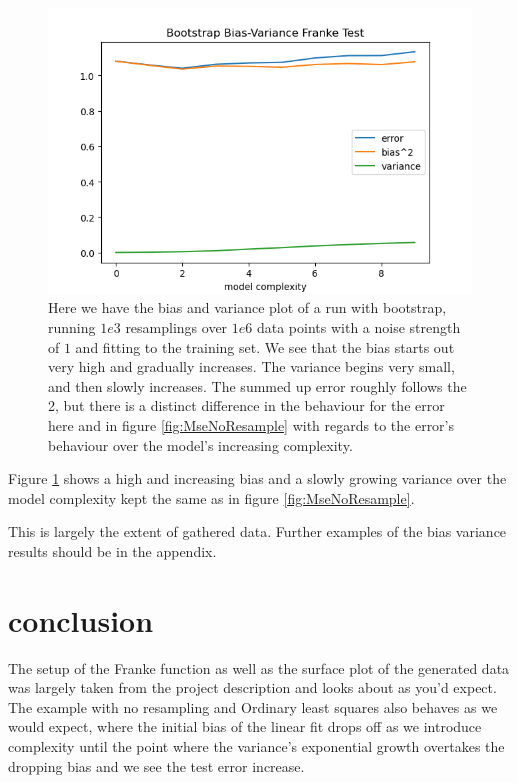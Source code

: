 \documentclass[12pt]{revtex4-2}
\begin{document}
\begin{figure}[hbtp]
\includegraphics[scale=0.7]{
	../plots/frankeBootstrapBiasVariancesigma1poly10boot1e3datapt1e6test.png}
\caption{
	Here we have the bias and variance plot of a run with bootstrap, running $1e3$ 
	resamplings over $1e6$ data points with a noise strength of $1$ and fitting to the training
	set. We see that the bias starts out very high and gradually increases. The variance begins 
	very small, and then slowly increases. The summed up error roughly follows the 2, but there 
	is a distinct difference in the behaviour for the error here and in figure 
	\ref{fig:MseNoResample} with regards to the error's behaviour over the model's increasing 
	complexity. 
	}
\label{fig:BootstrapBiasVariance1e6test}
\end{figure}
Figure \ref{fig:BootstrapBiasVariance1e6test} shows a high and increasing bias and a slowly
growing variance over the model complexity kept the same as in figure 
\ref{fig:MseNoResample}.

This is largely the extent of gathered data. Further examples of the bias variance 
results should be in the appendix. 

\section{conclusion}

The setup of the Franke function as well as the surface plot of the generated data was 
largely taken from the project description and looks about as you'd expect. The example 
with no resampling and Ordinary least squares also behaves as we would expect, where the 
initial bias of the linear fit drops off as we introduce complexity until the point 
where the variance's exponential growth overtakes the dropping bias and we see the test 
error increase. \\
\end{document}
